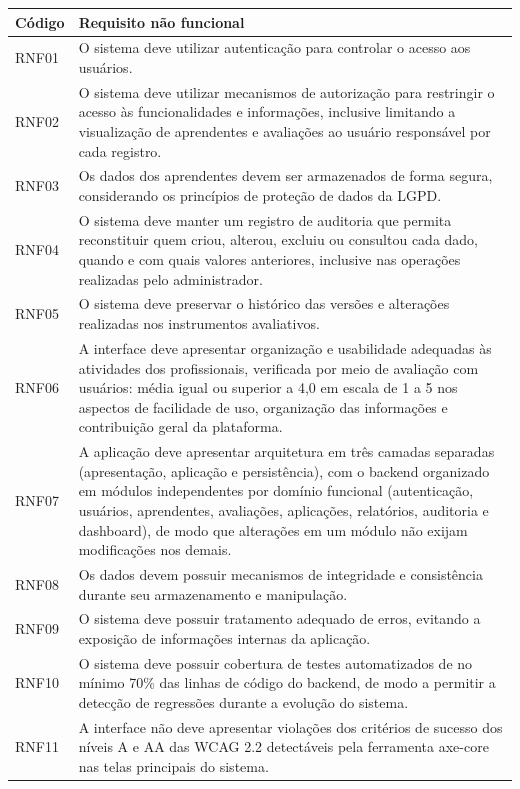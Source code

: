 \begin{quadro}[H]
\centering
\small
\caption{Requisitos não funcionais}
\begin{tabular}{p{2cm} p{13cm}}
\hline
\textbf{Código} & \textbf{Requisito não funcional} \\
\hline
RNF01 & O sistema deve utilizar autenticação para controlar o acesso aos usuários. \\
RNF02 & O sistema deve utilizar mecanismos de autorização para restringir o acesso às funcionalidades e informações, inclusive limitando a visualização de aprendentes e avaliações ao usuário responsável por cada registro. \\
RNF03 & Os dados dos aprendentes devem ser armazenados de forma segura, considerando os princípios de proteção de dados da LGPD. \\
RNF04 & O sistema deve manter um registro de auditoria que permita reconstituir quem criou, alterou, excluiu ou consultou cada dado, quando e com quais valores anteriores, inclusive nas operações realizadas pelo administrador. \\
RNF05 & O sistema deve preservar o histórico das versões e alterações realizadas nos instrumentos avaliativos. \\
RNF06 & A interface deve apresentar organização e usabilidade adequadas às atividades dos profissionais, verificada por meio de avaliação com usuários: média igual ou superior a 4,0 em escala de 1 a 5 nos aspectos de facilidade de uso, organização das informações e contribuição geral da plataforma. \\
RNF07 & A aplicação deve apresentar arquitetura em três camadas separadas (apresentação, aplicação e persistência), com o backend organizado em módulos independentes por domínio funcional (autenticação, usuários, aprendentes, avaliações, aplicações, relatórios, auditoria e dashboard), de modo que alterações em um módulo não exijam modificações nos demais. \\
RNF08 & Os dados devem possuir mecanismos de integridade e consistência durante seu armazenamento e manipulação. \\
RNF09 & O sistema deve possuir tratamento adequado de erros, evitando a exposição de informações internas da aplicação. \\
RNF10 & O sistema deve possuir cobertura de testes automatizados de no mínimo 70\% das linhas de código do backend, de modo a permitir a detecção de regressões durante a evolução do sistema. \\
RNF11 & A interface não deve apresentar violações dos critérios de sucesso dos níveis A e AA das WCAG 2.2 detectáveis pela ferramenta axe-core nas telas principais do sistema. \\
\hline
\end{tabular}
\label{qua:requisitos_nao_funcionais}
\end{quadro}
